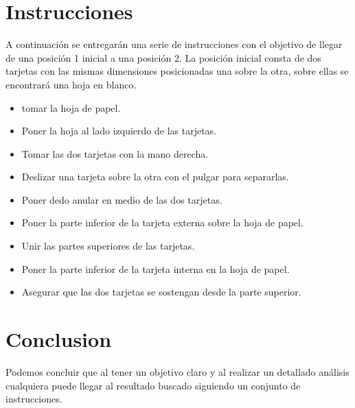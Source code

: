 \documentclass{article}
\begin{document}
\section{Instrucciones} \label{contenido}
A continuación se entregarán una serie de instrucciones con el objetivo de llegar de una posición 1 inicial a una posición 2. La posición inicial consta de dos tarjetas con las mismas dimensiones posicionadas una sobre la otra, sobre ellas se encontrará una hoja en blanco.
\begin{itemize}
    \item tomar la hoja de papel.
    \item Poner la hoja al lado izquierdo de las tarjetas.
    \item Tomar las dos tarjetas con la mano derecha.
    \item Deslizar una tarjeta sobre la otra con el pulgar para separarlas.
    \item Poner dedo anular en medio de las dos tarjetas.
    \item Poner la parte inferior de la tarjeta externa sobre la hoja de papel.
    \item Unir las partes superiores de las tarjetas.
    \item Poner la parte inferior de la tarjeta interna en la hoja de papel.
    \item Asegurar que las dos tarjetas se sostengan desde la parte superior.
\end{itemize}


\section{Conclusion}
Podemos concluir que al tener un objetivo claro y al realizar un detallado análisis cualquiera puede llegar al resultado buscado siguiendo un conjunto de instrucciones.




\end{document}
